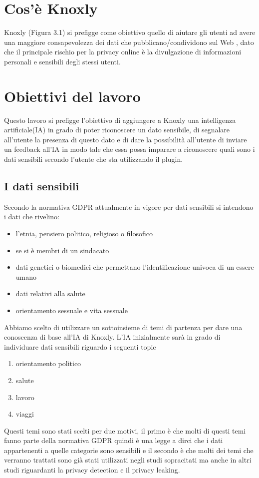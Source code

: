 \section{Cos'è Knoxly}
Knoxly (Figura 3.1) si prefigge come obiettivo quello di aiutare gli utenti ad avere una maggiore consapevolezza
dei dati che pubblicano/condividono sul Web , dato che il principale rischio per la privacy online è la divulgazione di
informazioni personali e sensibili degli stessi utenti.\newline

\section{Obiettivi del lavoro}
Questo lavoro si prefigge l'obiettivo di aggiungere a Knoxly una intelligenza artificiale(IA) in grado di poter riconoscere un dato sensibile, di segnalare all'utente la presenza di questo dato e di dare la possibilità all'utente di inviare un feedback all'IA in modo tale che essa possa imparare a riconoscere quali sono i dati sensibili secondo l'utente che sta utilizzando il plugin.
\subsection{I dati sensibili}
Secondo la normativa GDPR attualmente in vigore per dati sensibili si intendono i dati che rivelino:
\begin{itemize}
    \item l'etnia, pensiero politico, religioso o filosofico
    \item se si è membri di un sindacato
    \item dati genetici o biomedici che permettano l'identificazione univoca di un essere umano
    \item dati relativi alla salute
    \item orientamento sessuale e vita sessuale
\end{itemize}
Abbiamo scelto di utilizzare un sottoinsieme di temi di partenza per dare una conoscenza di base all'IA di Knoxly. L'IA inizialmente sarà in grado di individuare dati sensibili riguardo i seguenti topic
\begin{enumerate}
    \item orientamento politico
    \item salute
    \item lavoro
    \item viaggi
\end{enumerate}
Questi temi sono stati scelti per due motivi, il primo è che molti di questi temi fanno parte della normativa GDPR quindi è una legge a dirci che i dati appartenenti a quelle categorie sono sensibili e il secondo è che molti dei temi che verranno trattati sono già stati utilizzati negli studi sopracitati ma anche in altri studi riguardanti la privacy detection e il privacy leaking.